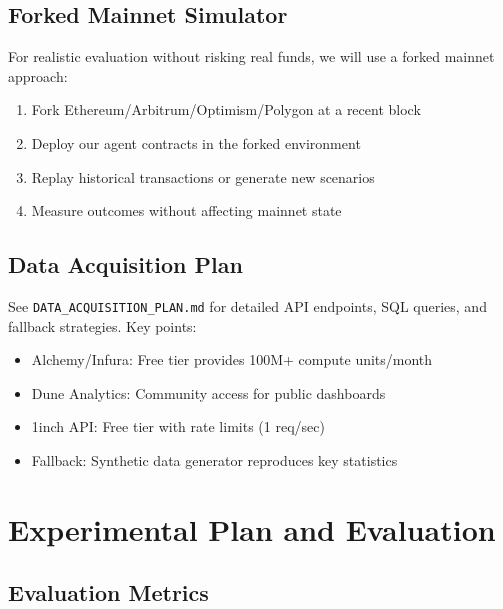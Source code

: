 \documentclass[11pt,a4paper]{article}
\begin{document}
\subsection{Forked Mainnet Simulator}

For realistic evaluation without risking real funds, we will use a forked mainnet approach:

\begin{enumerate}[leftmargin=2em]
    \item Fork Ethereum/Arbitrum/Optimism/Polygon at a recent block
    \item Deploy our agent contracts in the forked environment
    \item Replay historical transactions or generate new scenarios
    \item Measure outcomes without affecting mainnet state
\end{enumerate}

\subsection{Data Acquisition Plan}

See \texttt{DATA\_ACQUISITION\_PLAN.md} for detailed API endpoints, SQL queries, and fallback strategies. Key points:

\begin{itemize}[leftmargin=2em]
    \item Alchemy/Infura: Free tier provides 100M+ compute units/month
    \item Dune Analytics: Community access for public dashboards
    \item 1inch API: Free tier with rate limits (1 req/sec)
    \item Fallback: Synthetic data generator reproduces key statistics
\end{itemize}

\section{Experimental Plan and Evaluation}\label{sec:experiments}

\subsection{Evaluation Metrics}
\end{document}
